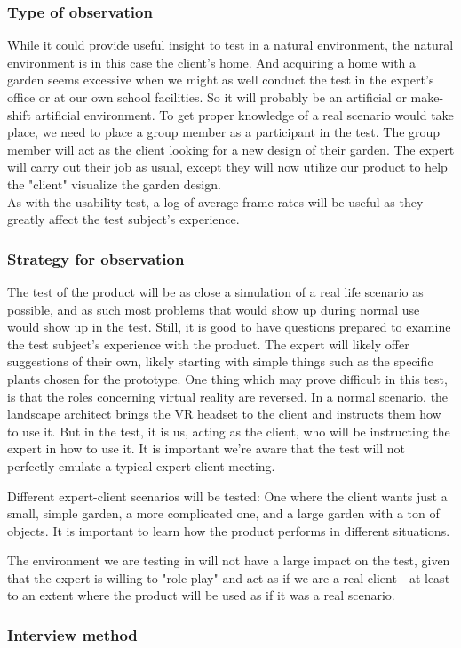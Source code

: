 \subsubsection{Type of observation}
While it could provide useful insight to test in a natural environment, the natural environment is in this case the client's home. And acquiring a home with a garden seems excessive when we might as well conduct the test in the expert's office or at our own school facilities. So it will probably be an artificial or make-shift artificial environment. To get proper knowledge of a real scenario would take place, we need to place a group member as a participant in the test. The group member will act as the client looking for a new design of their garden. The expert will carry out their job as usual, except they will now utilize our product to help the "client" visualize the garden design.\\
As with the usability test, a log of average frame rates will be useful as they greatly affect the test subject's experience. 

\subsubsection{Strategy for observation}
The test of the product will be as close a simulation of a real life scenario as possible, and as such most problems that would show up during normal use would show up in the test. Still, it is good to have questions prepared to examine the test subject's experience with the product. The expert will likely offer suggestions of their own, likely starting with simple things such as the specific plants chosen for the prototype. 
One thing which may prove difficult in this test, is that the roles concerning virtual reality are reversed. In a normal scenario, the landscape architect brings the VR headset to the client and instructs them how to use it. But in the test, it is us, acting as the client, who will be instructing the expert in how to use it. It is important we're aware that the test will not perfectly emulate a typical expert-client meeting. 

Different expert-client scenarios will be tested: One where the client wants just a small, simple garden, a more complicated one, and a large garden with a ton of objects. It is important to learn how the product performs in different situations. 

The environment we are testing in will not have a large impact on the test, given that the expert is willing to "role play" and act as if we are a real client - at least to an extent where the product will be used as if it was a real scenario. 


\subsubsection{Interview method}

